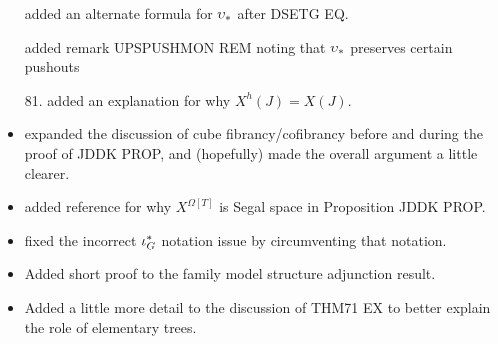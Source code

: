 \documentclass{article}
\begin{document}
\begin{itemize}

added an alternate formula for $\upsilon_{\**}$ after DSETG EQ.

added remark UPSPUSHMON REM noting that $\upsilon_{\**}$ preserves certain pushouts


\item[81.] added an explanation for why $X^h(J) = X(J)$.


\item expanded the discussion of cube fibrancy/cofibrancy before and during the proof of JDDK PROP, and (hopefully) made the overall argument a little clearer.

\item added reference for why $X^{\Omega[T]}$ is Segal space in Proposition JDDK PROP.

\item fixed the incorrect $\iota^{\**}_G$ notation issue by circumventing that notation.

\item Added short proof to the family model structure adjunction
 result.

\item Added a little more detail to the discussion of THM71 EX to better explain the role of elementary trees.

\end{itemize}



{}


\end{document}

